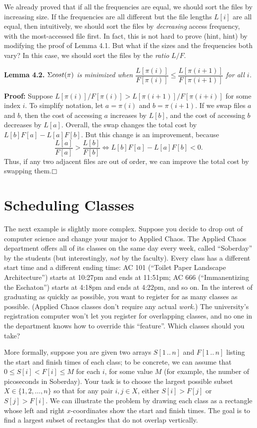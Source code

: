 We already proved that if all the frequencies are equal, we should sort the files by increasing size.
If the frequencies are all different but the file lengths $L[i]$ are all equal, then intuitively, we should sort the files by \textit{decreasing} access frequency, with the most-accessed file first.
In fact, this is not hard to prove (hint, hint) by modifying the proof of Lemma 4.1.
But what if the sizes and the frequencies both vary?
In this case, we should sort the files by the \textit{ratio} $L/F$.

\noindent\textbf{Lemma 4.2.} \textsl{$\Sigma cost(\pi)$ is minimized when $\dfrac{L[\pi(i)]}{F[\pi(i)]} \le \dfrac{L[\pi(i+1)]}{F[\pi(i+1)]}$ for all $i$.}

\noindent\textbf{Proof:} Suppose $L[\pi(i)]/F[\pi(i)] > L[\pi(i+1)]/F[\pi(i+i)]$ for some index $i$.
To simplify notation, let $a = \pi(i)$ and $b = \pi(i+1)$.
If we swap files $a$ and $b$, then the cost of accessing $a$ increases by $L[b]$, and the cost of accessing $b$ decreases by $L[a]$.
Overall, the swap changes the total cost by $L[b]F[a] - L[a]F[b]$.
But this change is an improvement, because
\[
\frac{L[a]}{F[a]} > \frac{L[b]}{F[b]} \iff L[b]F[a] - L[a]F[b] < 0.
\]
Thus, if any two adjacent files are out of order, we can improve the total cost by swapping them.\hfill$\mdlgwhtsquare$

\section{Scheduling Classes}
\label{sec:4.2}

The next example is slightly more complex.
Suppose you decide to drop out of computer science and change your major to Applied Chaos.
The Applied Chaos department offers all of its classes on the same day every week, called “Soberday” by the students (but interestingly, \textit{not} by the faculty).
Every class has a different start time and a different ending time: AC 101 (“Toilet Paper Landscape Architecture”) starts at 10:27pm and ends at 11:51pm; AC 666 (“Immanentizing the Eschaton”) starts at 4:18pm and ends at 4:22pm, and so on.
In the interest of graduating as quickly as possible, you want to register for as many classes as possible.
(Applied Chaos classes don’t require any actual \textit{work}.)
The university’s registration computer won’t let you register for overlapping classes, and no one in the department knows how to override this “feature”.
Which classes should you take?

More formally, suppose you are given two arrays $S[1\,..\,n]$ and $F[1\,..\,n]$ listing the start and finish times of each class; to be concrete, we can assume that $0 \le S[i] < F[i] \le M$ for each $i$, for some value $M$ (for example, the number of picoseconds in Soberday).
Your task is to choose the largest possible subset $X \in \{1,2,\dots,n\}$ so that for any pair $i, j \in X$, either $S[i] > F[j]$ or $S[j] > F[i]$.
We can illustrate the problem by drawing each class as a rectangle whose left and right $x$-coordinates show the start and finish times.
The goal is to find a largest subset of rectangles that do not overlap vertically.

